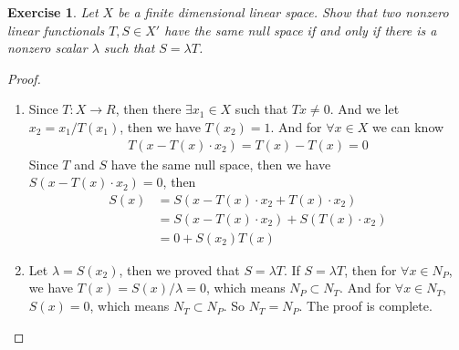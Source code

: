 \documentclass[10pt]{book}
\newtheorem{exercise}{Exercise}[section]
\theoremstyle{definition}
\numberwithin{equation}{chapter}
\begin{document}
\begin{exercise}
Let $X$ be a finite dimensional linear space. Show that two nonzero linear functionals $T,S\in X'$ have the same null space if and only if there is a nonzero scalar $\lambda$ such that $S = \lambda T$.
\end{exercise}
\begin{proof}
~\begin{enumerate}[label=(\alph*)]
    \item Since $T: X \rightarrow R$, then there $\exists x_1 \in X$ such that $T x \neq 0$. And we let $x_2  = x_1 / T(x_1)$, then we have $T(x_2) = 1$. And for $\forall x \in X$ we can know
    \begin{align*}
        T(x - T(x)\cdot x_2) = T(x) - T(x) = 0
    \end{align*}
    Since $T$ and $S$ have the same null space, then we have $S(x - T(x)\cdot x_2) = 0$, then 
    \begin{align*}
        S(x) & = S(x - T(x)\cdot x_2 + T(x)\cdot x_2) \\
        & = S(x - T(x)\cdot x_2) + S(T(x)\cdot x_2) \\
        & = 0 + S(x_2) T(x)
    \end{align*}
    \item Let $\lambda = S(x_2)$, then we proved that $S = \lambda T$.
    If $S = \lambda T$, then for $\forall x \in N_P$, we have $T(x) = S(x) / \lambda = 0$, which means $N_P \subset N_T$. And for $\forall x \in N_T$, $S(x) = 0$, which means $N_T \subset N_P$. So $N_T = N_P$. The proof is complete.
\end{enumerate}
\end{proof}

\medskip
\end{document}
